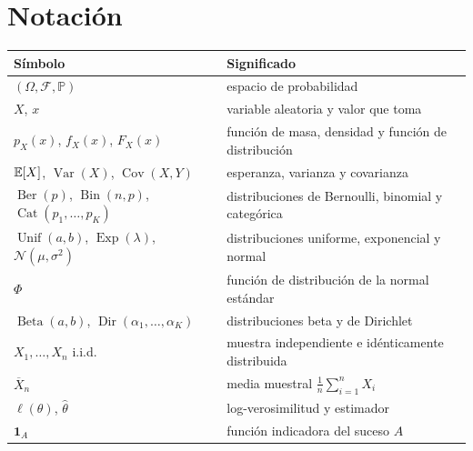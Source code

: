\documentclass[11pt,a4paper,twoside,openany]{book}
\DeclareMathOperator{\Var}{Var}
\DeclareMathOperator{\Cov}{Cov}
\DeclareMathOperator{\Ber}{Ber}
\DeclareMathOperator{\Bin}{Bin}
\DeclareMathOperator{\Cat}{Cat}
\DeclareMathOperator{\Unif}{Unif}
\DeclareMathOperator{\Expo}{Exp}
\DeclareMathOperator{\BetaD}{Beta}
\DeclareMathOperator{\Dir}{Dir}
\newcommand{\N}{\mathcal{N}}
\newcommand{\PP}{\mathbb{P}}
\newcommand{\iid}{i.i.d.}
\newcommand{\Xbar}{\overline{X}}
\begin{document}
\section*{Notación}
\begin{center}
\begin{tabular}{@{}ll@{}}
\toprule
Símbolo & Significado \\
\midrule
$(\Omega,\mathcal{F},\PP)$ & espacio de probabilidad \\
$X$, $x$ & variable aleatoria y valor que toma \\
$p_X(x)$, $f_X(x)$, $F_X(x)$ & función de masa, densidad y función de distribución \\
$\mathbb{E}[X]$, $\Var(X)$, $\Cov(X,Y)$ & esperanza, varianza y covarianza \\
$\Ber(p)$, $\Bin(n,p)$, $\Cat(p_1,\dots,p_K)$ & distribuciones de Bernoulli, binomial y categórica \\
$\Unif(a,b)$, $\Expo(\lambda)$, $\N(\mu,\sigma^{2})$ & distribuciones uniforme, exponencial y normal \\
$\Phi$ & función de distribución de la normal estándar \\
$\BetaD(a,b)$, $\Dir(\alpha_1,\dots,\alpha_K)$ & distribuciones beta y de Dirichlet \\
$X_1,\dots,X_n$ \iid & muestra independiente e idénticamente distribuida \\
$\Xbar_n$ & media muestral $\frac1n\sum_{i=1}^{n}X_i$ \\
$\ell(\theta)$, $\hat\theta$ & log-verosimilitud y estimador \\
$\mathbf{1}_A$ & función indicadora del suceso $A$ \\
\bottomrule
\end{tabular}
\end{center}


\tableofcontents

\mainmatter






\backmatter

\end{document}
